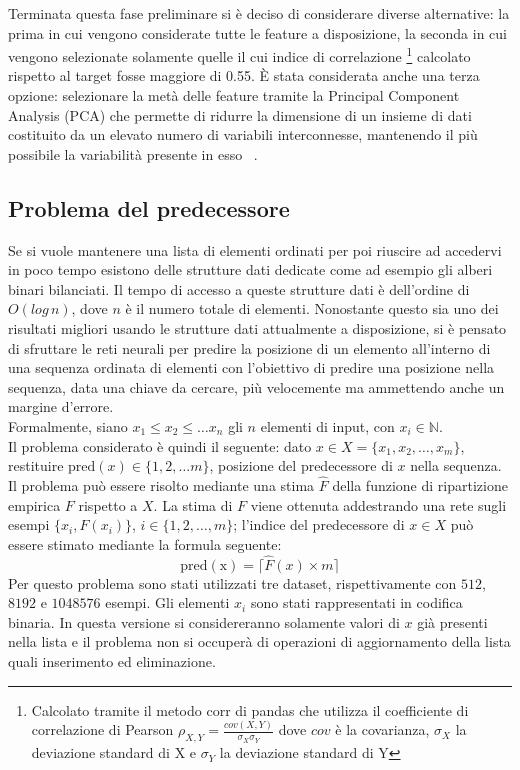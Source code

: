 \documentclass[12pt]{report}
\begin{document}
Terminata questa fase preliminare si è deciso di considerare diverse alternative: la prima in cui vengono considerate tutte le feature a disposizione, la seconda in cui vengono selezionate solamente quelle il cui indice di correlazione \footnote{Calcolato tramite il metodo corr di pandas che utilizza il coefficiente di correlazione di Pearson $\rho_{X,Y} = \frac{cov(X, Y)}{\sigma_X\sigma_Y}$ dove $cov$ è la covarianza, $\sigma_X$ la deviazione standard di X e $\sigma_Y$ la deviazione standard di Y} calcolato rispetto al target fosse maggiore di 0.55.
È stata considerata anche una terza opzione: selezionare la metà delle feature tramite la Principal Component Analysis (PCA) che permette di ridurre la dimensione di un insieme di dati costituito da un elevato numero di variabili interconnesse, mantenendo il più possibile la variabilità presente in esso ~\cite{PCA}. 

\subsection{Problema del predecessore}\label{probPred}
Se si vuole mantenere una lista di elementi ordinati per poi riuscire ad accedervi in poco tempo esistono delle strutture dati dedicate come ad esempio gli alberi binari bilanciati. Il tempo di accesso a queste strutture dati è dell'ordine di $O(log\,n)$, dove $n$ è il numero totale di elementi. Nonostante questo sia uno dei risultati migliori usando le strutture dati attualmente a disposizione, si è pensato di sfruttare le reti neurali per predire la posizione di un elemento all'interno di una sequenza ordinata di elementi con l'obiettivo di predire una posizione nella sequenza, data una chiave da cercare, più velocemente ma ammettendo anche un margine d'errore. \\
Formalmente, siano $x_1 \leq x_2 \leq \dots x_n$ gli $n$ elementi di input, con $x_i \in \mathbb{N}$.\\
Il problema considerato è quindi il seguente: dato $x \in X = \{x_1, x_2, \dots, x_m\}$, restituire $\mathrm{pred}(x) \in \{1, 2, \dots m\}$, posizione del predecessore di $x$ nella sequenza.
Il problema può essere risolto mediante una stima $\hat{F}$ della funzione di ripartizione empirica $F$ rispetto a $X$. La stima di $F$ viene ottenuta addestrando una rete sugli esempi $\{x_i, F(x_i)\}$, $i \in \{1, 2, \dots, m \}$; l'indice del predecessore di $x \in X$ può essere stimato mediante la formula seguente:
\begin{equation}
\mathrm{pred(x)} = \lceil\hat{F}(x)\times m\rceil
\label{empirical}
\end{equation}
Per questo problema sono stati utilizzati tre dataset, rispettivamente con $512$, $8192$ e $1048576$ esempi. Gli elementi $x_i$ sono stati rappresentati in codifica binaria. In questa versione si considereranno solamente valori di $x$ già presenti nella lista e il problema non si occuperà di operazioni di aggiornamento della lista quali inserimento ed eliminazione.
\end{document}
